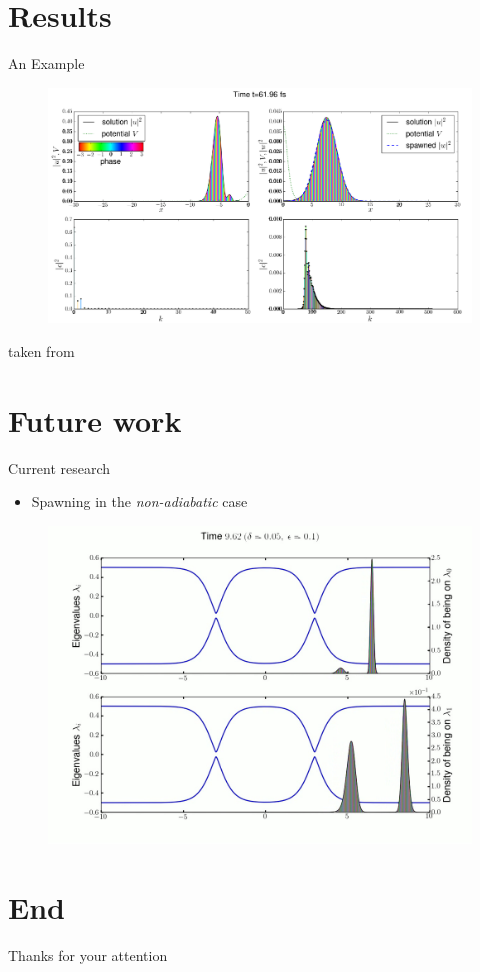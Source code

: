 \documentclass{beamer}
\begin{document}
\section{Results}


\begin{frame}{An Example}
  \begin{figure}
    \centering
    \includegraphics{./fig/spawned.png}
  \end{figure}
  \tiny{{taken from \cite{GHJ10a}}}
\end{frame}


\section{Future work}


\begin{frame}{Current research}
  \begin{itemize}
    \item Spawning in the \emph{non-adiabatic} case
  \end{itemize}
  \begin{figure}
    \centering
    \includegraphics[scale=0.2]{./fig/nonadiabatic.png}
  \end{figure}
\end{frame}


\section{End}


\begin{frame}{Thanks for your attention}
  
  
\end{frame}
\end{document}
